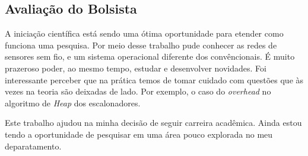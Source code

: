 \documentclass[a4paper, 10pt]{article}
\begin{document}
\subsection{Avaliação do Bolsista}
A iniciação científica está sendo uma ótima oportunidade para etender como funciona uma pesquisa. Por meio desse trabalho pude conhecer as redes de sensores sem fio, e um sistema operacional diferente dos convêncionais. É muito prazeroso poder, ao mesmo tempo, estudar e desenvolver novidades. Foi interessante perceber que na prática temos de tomar cuidado com questões que às vezes na teoria são deixadas de lado. Por exemplo, o caso do \textit{overhead} no algoritmo de \textit{Heap} dos escalonadores. 

Este trabalho ajudou na minha decisão de seguir carreira acadêmica. Ainda estou tendo a oportunidade de pesquisar em uma área pouco explorada no meu deparatamento.

%


\end{document}
